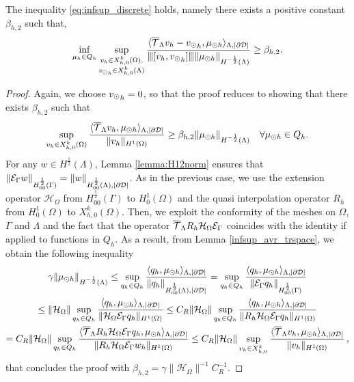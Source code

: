 \documentclass[r]{siamart171218}
\begin{document}
\begin{theorem} 
The inequality \eqref{eq:infsup_discrete} holds, 
namely there exists a positive constant $\beta_{h,2}$ such that,
\begin{equation}
\inf_{\mu_h \in Q_h} 
\sup_{\substack{v_h \in X_{h,0}^k(\Omega),\\ {v_{\odot}}_h \in X_{h,0}^k(\Lambda)} }\frac{\langle {\overline{\mathcal{T}}_\Lambda} v_h -  {v_{\odot}}_h, \mu_{\odot h} \rangle _{\Lambda,|\partial\mathcal{D}|} } {{\left\vert\kern-0.25ex\left\vert\kern-0.25ex\left\vert [v_h, {v_{\odot}}_h] \right\vert\kern-0.25ex\right\vert\kern-0.25ex\right\vert} \|\mu_{\odot h}\|_{H^{-\frac 12 }(\Lambda)} } 
\geq \beta_{h,2}. 
\end{equation}
\end{theorem}
\begin{proof}
 Again, we choose ${v_{\odot}}_h =0$, so that the proof reduces to showing that there exists $\beta_{h,2}$ such that
\begin{equation*}
\sup_{v_h \in X_{h,0}^k(\Omega)} \frac{ \langle {\overline{\mathcal{T}}_\Lambda} v_h , \mu_{\odot h} \rangle _{\Lambda,|\partial\mathcal{D}|} } {\|v_h\|_{H^1(\Omega)} }\geq \beta_{h,2} \|\mu_{\odot h}\|_{H^{-\frac 12}(\Lambda)} 
\quad \forall \mu_{\odot h} \in Q_h.
\end{equation*}
For any $w \in H^{\frac 12}(\Lambda)$, Lemma \ref{lemma:H12norm} ensures that 
$\|\mathcal{E}_\Gamma w\|_{H^{\frac 12}_{00}(\Gamma)} = \|w\|_{H^{\frac 12}_{00}(\Lambda),|\partial\mathcal{D}|}$.
As in the previous case, we use the extension operator $\mathcal{H}_{\Omega}$ from $H^{\frac 12}_{00}(\Gamma)$ to $H^1_0(\Omega)$ and the quasi interpolation operator $R_h$ from $H^1_0(\Omega)$ to $X_{h,0}^k(\Omega)$. Then, we exploit the conformity of the meshes on $\Omega$, $\Gamma$ and $\Lambda$ and the fact that the operator ${\overline{\mathcal{T}}_\Lambda} R_h \mathcal{H}_{\Omega} \mathcal{E}_\Gamma$ coincides with the identity if applied to functions in $Q_h$. As a result, from Lemma \ref{infsup_avr_trspace}, we obtain the following inequality 
\begin{multline*}
\gamma \|\mu_{\odot h}\|_{H^{-\frac 12}(\Lambda)} \leq 
\sup_{q_h \in Q_h} \frac{ \langle q_h, \mu_{\odot h} \rangle_{\Lambda,|\partial\mathcal{D}|} } {\|q_h\|_{H^{\frac 12}_{00}(\Lambda),|\partial\mathcal{D}|}} 
=  \sup_{q_h \in Q_h} \frac{ \langle q_h, \mu_{\odot h} \rangle _{\Lambda,|\partial\mathcal{D}|}} {\|\mathcal{E}_\Gamma q_h\|_{H^{\frac 12}_{00}(\Gamma)}} 
\\
\leq \|\mathcal{H}_{\Omega}\| \sup_{q_h \in Q_h} \frac{ \langle q_h, \mu_{\odot h} \rangle _{\Lambda,|\partial\mathcal{D}|} } {\|\mathcal{H}_{\Omega} \mathcal{E}_\Gamma q_h\|_{H^1(\Omega)}} 
\leq C_R\|\mathcal{H}_{\Omega}\| \sup_{q_h \in Q_h} \frac{ \langle q_h, \mu_{\odot h} \rangle _{\Lambda,|\partial\mathcal{D}|} } {\|R_h \mathcal{H}_{\Omega} \mathcal{E}_\Gamma q_h\|_{H^1(\Omega)}}
\\
=  C_R\|\mathcal{H}_{\Omega}\|\sup_{q_h \in Q_h} \frac{ \langle {\overline{\mathcal{T}}_\Lambda} R_h \mathcal{H}_{\Omega} \mathcal{E}_\Gamma q_h, \mu_{\odot h} \rangle _{\Lambda,|\partial\mathcal{D}|}} {\|R_h \mathcal{H}_{\Omega} \mathcal{E}_\Gamma w_h\|_{H^1(\Omega)}}
\leq C_R\|\mathcal{H}_{\Omega}\| \sup_{v_h \in X_{h,0}^k} \frac{ \langle {\overline{\mathcal{T}}_\Lambda} v_h, \mu_{\odot h} \rangle _{\Lambda,|\partial\mathcal{D}|}} {\|v_h\|_{H^1(\Omega)}}\,,
\end{multline*}
that concludes the proof with $\beta_{h,2} = \gamma \|\mathcal{H}_{\Omega}\|^{-1} C_R^{-1}$.
\end{proof}
\end{document}
